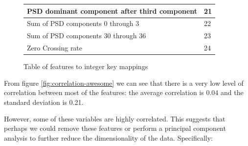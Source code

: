\documentclass[ %
                    author={Sam Phippen},
                supervisor={Dr. Rafal Bogacz},
                     title={Real time voice activity detectors in noisy personal computing environments},
                  subtitle={},
                    degree={MEng},
                      year={2012} ]{thesis}
\begin{document}
\begin{figure}
\begin{center}
\begin{tabular}{ |l|l| }
            PSD dominant component after third component  & 21 \\ \hline
            Sum of PSD components 0 through 3             & 22 \\ \hline
            Sum of PSD components 30 through 36           & 23 \\ \hline
            Zero Crossing rate                            & 24 \\ \hline
        \end{tabular}
    \end{center}
    \caption{Table of features to integer key mappings}
    \label{fig:feature-keys}
\end{figure}

From figure \ref{fig:correlation-awesome} we can see that there is a very low
level of correlation between most of the features: the average correlation is
0.04 and the standard deviation is 0.21.

However, some of these variables are highly correlated. This suggests that
perhaps we could remove these features or perform a principal component
analysis to further reduce the dimensionality of the data. Specifically:
\end{document}
